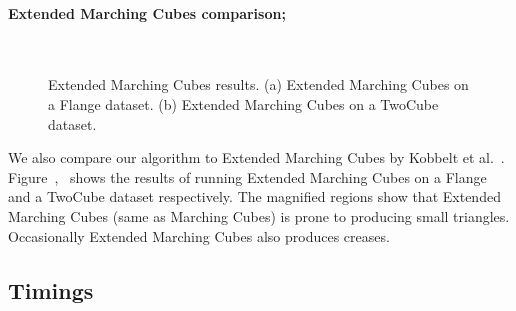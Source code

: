 \paragraph{Extended Marching Cubes comparison;}
\begin{figure}[tb]
	\centering
	\\
	\caption{Extended Marching Cubes results. (a) Extended Marching Cubes on a Flange dataset. (b) Extended Marching Cubes on a TwoCube dataset.}	
\end{figure}
We also compare our algorithm to Extended Marching Cubes by Kobbelt et al.~\cite{kbsh-fssev-01}. Figure~\protect{},~\protect{} shows the results of running Extended Marching Cubes on a Flange and a TwoCube dataset respectively. The magnified regions show that Extended Marching Cubes (same as Marching Cubes) is prone to producing small triangles. Occasionally Extended Marching Cubes also produces creases. 
\subsection{Timings}

